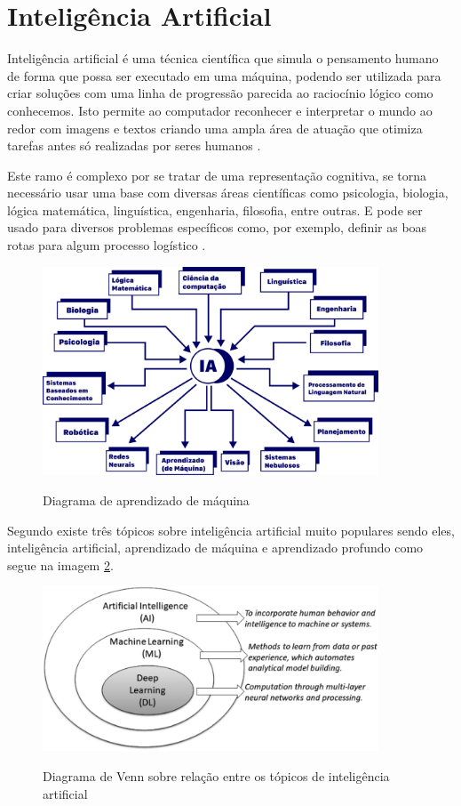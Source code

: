 \section{Inteligência Artificial}

Inteligência artificial é uma técnica científica que simula o pensamento humano de forma que possa ser executado em uma máquina, podendo ser utilizada para criar soluções com uma linha de progressão parecida ao raciocínio lógico como conhecemos. Isto permite ao computador reconhecer e interpretar o mundo ao redor com imagens e textos criando uma ampla área de atuação que otimiza tarefas antes só realizadas por seres humanos \space\cite{ia_aliada_ou_inimiga}.

Este ramo é complexo por se tratar de uma representação cognitiva, se torna necessário usar uma base com diversas áreas científicas como psicologia, biologia, lógica matemática, linguística, engenharia, filosofia, entre outras. E pode ser usado para diversos problemas específicos como, por exemplo, definir as boas rotas para algum processo logístico \space\cite{ia_conceitos_aplicacoes}.

\begin{figure}[H]
	\caption{Diagrama de aprendizado de máquina}
	\centering %
	\includegraphics[width=10cm]{figures/areas_ia.png} %
	\label{fig:areas_ia}
\end{figure}

Segundo  existe três tópicos sobre inteligência artificial muito populares sendo eles, inteligência artificial, aprendizado de máquina e aprendizado profundo como segue na imagem \cref{fig:diagrama_ia_ml_dp}.

\begin{figure}[H]
	\caption{Diagrama de Venn sobre relação entre os tópicos de inteligência artificial}
	\centering %
	\includegraphics[width=10cm]{figures/diagrama_ia_ml_dp.png} %
	\label{fig:diagrama_ia_ml_dp}
\end{figure}

